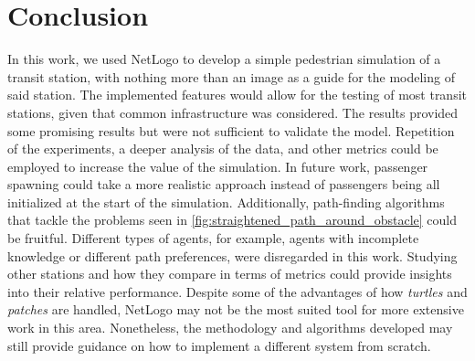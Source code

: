 \section{Conclusion} \label{sec:conclusion}
In this work, we used NetLogo to develop a simple pedestrian simulation of a transit station, with nothing more than an image as a guide for the modeling of said station. The implemented features would allow for the testing of most transit stations, given that common infrastructure was considered.
The results provided some promising results but were not sufficient to validate the model. Repetition of the experiments, a deeper analysis of the data, and other metrics could be employed to increase the value of the simulation.
In future work, passenger spawning could take a more realistic approach instead of passengers being all initialized at the start of the simulation. Additionally, path-finding algorithms that tackle the problems seen in \autoref{fig:straightened_path_around_obstacle} could be fruitful. Different types of agents, for example, agents with incomplete knowledge or different path preferences, were disregarded in this work. Studying other stations and how they compare in terms of metrics could provide insights into their relative performance. Despite some of the advantages of how \textit{turtles} and \textit{patches} are handled, NetLogo may not be the most suited tool for more extensive work in this area. Nonetheless, the methodology and algorithms developed may still provide guidance on how to implement a different system from scratch.